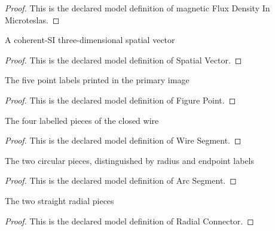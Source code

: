 \begin{proof}
  This is the declared model definition of magnetic Flux Density In Microteslas.
\end{proof}
\begin{definition}
  \label{def:physics:phyx-mini-0966:phyxminiproblems-problemphyxmini0966-spatialvector}
  A coherent-SI three-dimensional spatial vector
\end{definition}
\begin{proof}
  This is the declared model definition of Spatial Vector.
\end{proof}
\begin{definition}
  \label{def:physics:phyx-mini-0966:phyxminiproblems-problemphyxmini0966-figurepoint}
  The five point labels printed in the primary image
\end{definition}
\begin{proof}
  This is the declared model definition of Figure Point.
\end{proof}
\begin{definition}
  \label{def:physics:phyx-mini-0966:phyxminiproblems-problemphyxmini0966-wiresegment}
  The four labelled pieces of the closed wire
\end{definition}
\begin{proof}
  This is the declared model definition of Wire Segment.
\end{proof}
\begin{definition}
  \label{def:physics:phyx-mini-0966:phyxminiproblems-problemphyxmini0966-arcsegment}
  The two circular pieces, distinguished by radius and endpoint labels
\end{definition}
\begin{proof}
  This is the declared model definition of Arc Segment.
\end{proof}
\begin{definition}
  \label{def:physics:phyx-mini-0966:phyxminiproblems-problemphyxmini0966-radialconnector}
  The two straight radial pieces
\end{definition}
\begin{proof}
  This is the declared model definition of Radial Connector.
\end{proof}
